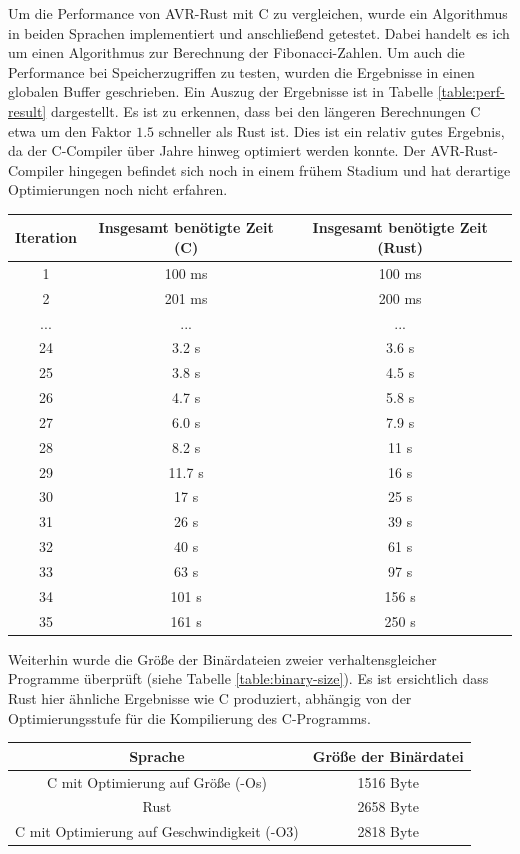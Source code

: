 \documentclass
[ 12pt,
  parskip=half %
]{scrreprt}
\begin{document}
Um die Performance von AVR-Rust mit C zu vergleichen, wurde ein Algorithmus in beiden Sprachen implementiert und anschließend getestet. Dabei handelt es ich um einen Algorithmus zur Berechnung der Fibonacci-Zahlen. Um auch die Performance bei Speicherzugriffen zu testen, wurden die Ergebnisse in einen globalen Buffer geschrieben. Ein Auszug der Ergebnisse ist in Tabelle \ref{table:perf-result} dargestellt. Es ist zu erkennen, dass bei den längeren Berechnungen C etwa um den Faktor $1.5$ schneller als Rust ist. Dies ist ein relativ gutes Ergebnis, da der C-Compiler über Jahre hinweg optimiert werden konnte. Der AVR-Rust-Compiler hingegen befindet sich noch in einem frühem Stadium und hat derartige Optimierungen noch nicht erfahren.

\begin{center}
	\begin{tabulary}{\columnwidth}{|C|C|C|}
		\hline
		\textbf{Iteration} & \textbf{Insgesamt benötigte Zeit (C)} & \textbf{Insgesamt benötigte Zeit (Rust)} \\
		 & 100 ms & 100 ms \\
		2 & 201 ms & 200 ms \\
		... & ... & ...\\
		24 & 3.2 s & 3.6 s\\
		25 & 3.8 s & 4.5 s\\
		26 & 4.7 s & 5.8 s\\
		27 & 6.0 s & 7.9 s\\
		28 & 8.2 s & 11 s\\
		29 & 11.7 s & 16 s\\
		30 & 17 s & 25 s\\
		31 & 26 s & 39 s\\
		32 & 40 s & 61 s\\
		33 & 63 s & 97 s\\
		34 & 101 s & 156 s\\
		35 & 161 s & 250 s\\
		\hline
	\end{tabulary}
	\label{table:perf-result}
\end{center}

Weiterhin wurde die Größe der Binärdateien zweier verhaltensgleicher Programme überprüft (siehe Tabelle \ref{table:binary-size}). Es ist ersichtlich dass Rust hier ähnliche Ergebnisse wie C produziert, abhängig von der Optimierungsstufe für die Kompilierung des C-Programms.

\begin{center}
	\begin{tabulary}{\columnwidth}{|C|C|}
		\hline
		\textbf{Sprache} & \textbf{Größe der Binärdatei} \\
		\hline
		C mit Optimierung auf Größe (-Os) & 1516 Byte \\
		\hline
		Rust & 2658 Byte \\
		\hline
		C mit Optimierung auf Geschwindigkeit (-O3) & 2818 Byte\\
		\hline
	\end{tabulary}
	\label{table:binary-size}
\end{center}
\end{document}
